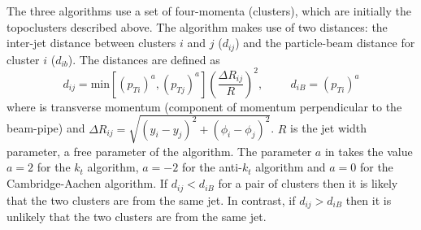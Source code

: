The three algorithms use a set of four-momenta (clusters), which are initially the topoclusters described above.
The algorithm makes use of two distances: the inter-jet distance between clusters $i$ and $j$ ($d_{ij}$) 
and the particle-beam distance for cluster $i$ ($d_{ib}$). The distances are defined as
\begin{equation}
  d_{ij} = \text{min}[(p_{ Ti})^a, (p_{ Tj})^a]  \left(\frac{\Delta  R_{ij}}{R}\right) ^2, \hspace{1cm}  d_{iB} = (p_{Ti})^a  \label{dij}
\end{equation}
where \pT{} is transverse momentum (component of momentum perpendicular to the beam-pipe)
and $\Delta R_{ij} = \sqrt{(y_{i}-y_{j})^2 + (\phi_{i}-\phi_{j})^2}$.
$R$ is the jet width parameter, a free parameter of the algorithm.
The parameter $a$ in takes the value $a = 2$ for the $k_t$ algorithm, $a = -2$ for the anti-$k_t$ algorithm 
and  $a = 0$ for the Cambridge-Aachen algorithm.
If $d_{ij} < d_{iB}$ for a pair of clusters then it is likely that the two clusters are from the same jet. 
In contrast, if $d_{ij} > d_{iB}$ then it is unlikely that the two clusters are from the same jet.

 
